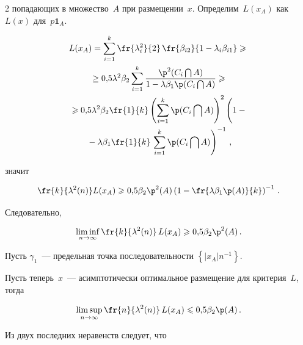 \begin{multicols}{2}
попадающих в множество~$A$ при размещении~$x$. Определим~$L(x_A)$ как~$L(x)$ для~$p\mathbf{1}_A$.


\begin{multline*}


L(x_A)=\suml{i=1}{k}\fr{\lambda_i^2}{2}\,\fr{\beta_{i2}} {1-\lambda_i \beta_{i1}}\geqslant{}\\


{}\geq


0{,}5\lambda^2\beta_2\suml{i=1}{k} \frac{{\p}^2(C_i\bigcap A)} {1-\lambda \beta_1


{\p}(C_i\bigcap A)}\geqslant{}\\


{}\geqslant 0{,}5\lambda^2\beta_2 \fr{1}{k}\left(\suml{i=1}{k}{\p}(C_i\bigcap A)\right)^2


\left(


\vphantom{\suml{i=1}{k}}


1-{}\right.\\


\left.{}-\lambda \beta_1 \fr{1}{k}\,\suml{i=1}{k}{\p}(C_i\bigcap A)\right)^{-1}\,,


\end{multline*}


значит


$$


\fr{k}{\lambda^2(n)}L(x_A)\geqslant 0{,}5\beta_2{\p}^2(A)\left(1-\fr{\lambda \beta_1


{\p}(A)}{k}\right)^{-1}\,.


$$


Следовательно,


$$


\limi{n \to \infty}\fr{k}{\lambda^2(n)}\,L(x_A)\geqslant 0{,}5\beta_2{\p}^2(A)\,.


$$


Пусть $\gamma_1$~--- предельная точка последовательности $\left\{\left|x_A\right|n^{-1}


\right\}$.


\smallskip





Пусть теперь~$x$~--- асимптотически оптимальное размещение для критерия~$L$, тогда


$$


\lims{n \to \infty}\fr{n}{\lambda^2(n)}\,L(x_A) \leqslant 0{,}5\beta_2{\p}(A)\,.


$$


Из двух последних неравенств следует, что



\end{multicols}
